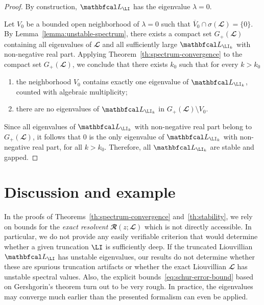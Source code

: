 \documentclass{SciPost}
\begin{document}
\begin{proof}
    By construction, \(\mathbfcal L_\LI\) has the eigenvalue \(\lambda = 0\).

    Let \(V_0\) be a bounded open neighborhood of \(\lambda = 0\) such that
    $\overline V_0 \cap \sigma(\mathbfcal L) = \{0\}$.
    By Lemma~\ref{lemma:unstable-spectrum}, there exists a compact set \(G_+(\mathbfcal L)\) containing all eigenvalues of \(\mathbfcal L\) and all sufficiently large \(\mathbfcal L_{\LI_k}\) with non-negative real part. Applying Theorem~\ref{th:spectrum-convergence} to the compact set \(G_+(\mathbfcal L)\), we conclude that there exists $k_0$ such that for every $k > k_0$
    \begin{enumerate}
        \item
            the neighborhood \(V_0\) contains exactly one eigenvalue of \(\mathbfcal L_{\LI_k}\), counted with algebraic multiplicity;

        \item
            there are no eigenvalues of \(\mathbfcal L_{\LI_k}\) in
        $G_+(\mathbfcal L) \setminus V_0$.
    \end{enumerate}
    Since all eigenvalues of \(\mathbfcal L_{\LI_k}\) with non-negative real part belong to \(G_+(\mathbfcal L)\), it follows that \(0\) is the only eigenvalue of \(\mathbfcal L_{\LI_k}\) with non-negative real part, for all $k > k_0$. Therefore, all \(\mathbfcal L_{\LI_k}\) are stable and gapped.
\end{proof}

\section{Discussion and example}
\label{sec:discussion}

In the proofs of Theorems~\ref{th:spectrum-convergence} and~\ref{th:stability}, we rely on bounds for the \emph{exact resolvent} \(\mathbfcal R(z; \mathbfcal L)\) which is not directly accessible. In particular, we do not provide any easily verifiable criterion that would determine whether a given truncation $\LI$ is sufficiently deep. If the truncated Liouvillian \(\mathbfcal L_\LI\) has unstable eigenvalues, our results do not determine whether these are spurious truncation artifacts or whether the exact Liouvillian \(\mathbfcal L\) has unstable spectral values. Also, the explicit bounds~\eqref{eq:schur-error-bound} based on Gershgorin's theorem turn out to be very rough. In practice, the eigenvalues may converge much earlier than the presented formalism can even be applied.
\end{document}
